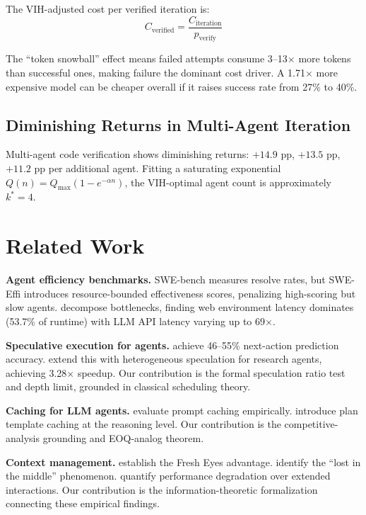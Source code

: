 \documentclass[11pt, a4paper, copyright]{googledeepmind}
\begin{document}
The VIH-adjusted cost per verified iteration is:
\[
    C_{\mathrm{verified}} = \frac{C_{\mathrm{iteration}}}{p_{\mathrm{verify}}}
\]

The ``token snowball'' effect \citep{sweeffi2025} means failed attempts consume 3--13$\times$ more tokens than successful ones, making failure the dominant cost driver. A 1.71$\times$ more expensive model can be cheaper overall if it raises success rate from 27\% to 40\%.

\subsection{Diminishing Returns in Multi-Agent Iteration}

Multi-agent code verification shows diminishing returns: $+14.9$ pp, $+13.5$ pp, $+11.2$ pp per additional agent. Fitting a saturating exponential $Q(n) = Q_{\max}(1 - e^{-\alpha n})$, the VIH-optimal agent count is approximately $k^* = 4$.


\section{Related Work}\label{sec:related}

\textbf{Agent efficiency benchmarks.} SWE-bench \citep{sweeffi2025} measures resolve rates, but SWE-Effi introduces resource-bounded effectiveness scores, penalizing high-scoring but slow agents. \citet{bian2025limits} decompose bottlenecks, finding web environment latency dominates (53.7\% of runtime) with LLM API latency varying up to 69$\times$.

\textbf{Speculative execution for agents.} \citet{zhou2025speculative} achieve 46--55\% next-action prediction accuracy. \citet{ji2026dualspec} extend this with heterogeneous speculation for research agents, achieving 3.28$\times$ speedup. Our contribution is the formal speculation ratio test and depth limit, grounded in classical scheduling theory.

\textbf{Caching for LLM agents.} \citet{liang2026cache} evaluate prompt caching empirically. \citet{zhang2025apc} introduce plan template caching at the reasoning level. Our contribution is the competitive-analysis grounding and EOQ-analog theorem.

\textbf{Context management.} \citet{suzgun2024metaprompting} establish the Fresh Eyes advantage. \citet{liu2024lost} identify the ``lost in the middle'' phenomenon. \citet{agentdrift2026} quantify performance degradation over extended interactions. Our contribution is the information-theoretic formalization connecting these empirical findings.
\end{document}
